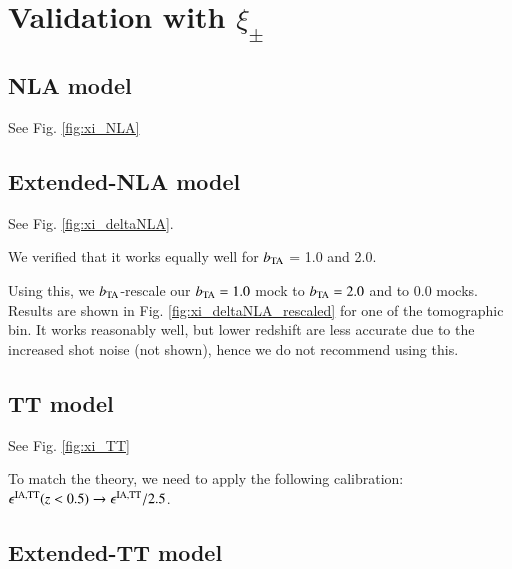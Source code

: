 \section{Validation with $\xi_{\pm}$}
\label{sec:validation}




\subsection{NLA model}
\label{subsubsec:sigma_G}

See Fig. \ref{fig:xi_NLA}



\subsection{Extended-NLA model}
\label{subsec:deltaNLA}

See Fig. \ref{fig:xi_deltaNLA}.






We verified that it works equally well for $b_{\rm TA}$ = 1.0 and 2.0.


Using this, we $b_{\rm TA}$-rescale our $b_{\rm TA}=1.0$ mock to $b_{\rm TA}=2.0$ and to $0.0$ mocks. Results are shown in Fig. \ref{fig:xi_deltaNLA_rescaled} for one of the tomographic bin. 
It works reasonably well, but lower redshift are less accurate due to the increased  shot noise (not shown), hence we do not recommend using this.

\subsection{TT model}
\label{subsec:TT}

See Fig. \ref{fig:xi_TT}






To match the theory, we need to apply the following calibration: $\epsilon^{\rm IA, TT}(z<0.5) \rightarrow \epsilon^{\rm IA, TT} /2.5$.

\subsection{Extended-TT model}
\label{subsec:TT}


